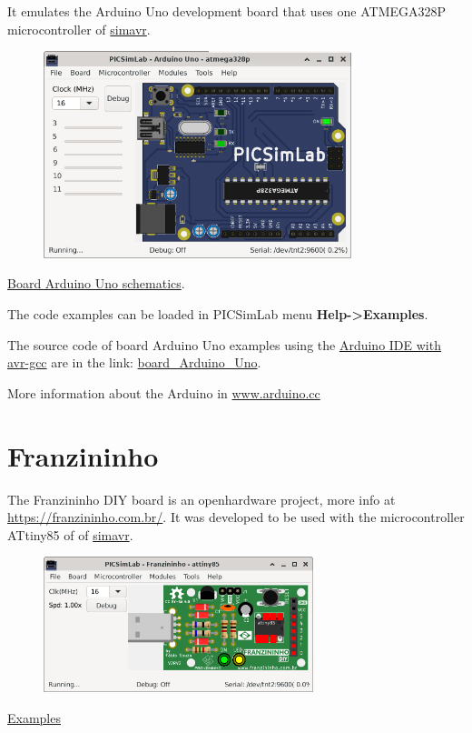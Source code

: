 It emulates the Arduino Uno development board that uses one ATMEGA328P microcontroller of \href{https://github.com/buserror/simavr}{simavr}.

\begin{figure}[H]
\center
\includegraphics[width=0.80\textwidth]{img/picsimlab5.png} 
\end{figure} 

\href{https://www.arduino.cc/en/uploads/Main/Arduino_Uno_Rev3-schematic.pdf}{Board Arduino Uno schematics}.\vspace{0.5cm}

The code examples can be loaded in PICSimLab menu \textbf{Help->Examples}.

The source code of board Arduino Uno examples using the 
\href{https://www.arduino.cc/en/Main/Software}{Arduino IDE with avr-gcc} are in the link: 
\href{https://lcgamboa.github.io/picsimlab_examples/board_Arduino_Uno.html}{board\_Arduino\_Uno}.

More information about the Arduino in \href{https://www.arduino.cc/}{www.arduino.cc}

\section{Franzininho}

The Franzininho DIY board is an openhardware project, more info at \href{https://franzininho.com.br/}{https://franzininho.com.br/}.
It was developed to be used with the microcontroller ATtiny85 of 
of \href{https://github.com/buserror/simavr}{simavr}.

\begin{figure}[H]
\center
\includegraphics[width=0.7\textwidth]{img/board_Franzininho.png} 
\end{figure} 

\href{https://lcgamboa.github.io/picsimlab_examples/board_Franzininho.html}{Examples}

